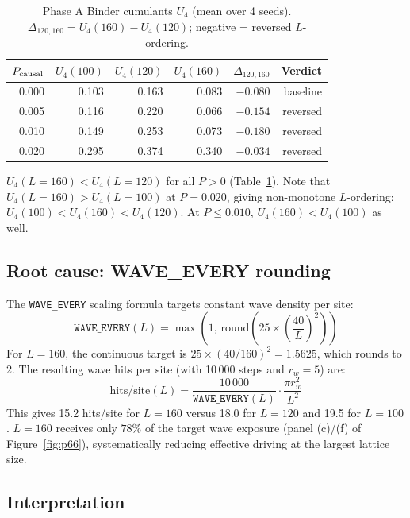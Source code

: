 \documentclass[12pt,a4paper]{article}
\begin{document}
\begin{table}[h]
\centering
\caption{Phase A Binder cumulants $U_4$ (mean over 4 seeds).
$\Delta_{120,160} = U_4(160) - U_4(120)$; negative = reversed $L$-ordering.}
\label{tab:phaseA}
\begin{tabular}{rrrrrr}
\toprule
$P_{\rm causal}$ & $U_4(100)$ & $U_4(120)$ & $U_4(160)$ & $\Delta_{120,160}$ & Verdict \\
\midrule
0.000 & 0.103 & 0.163 & 0.083 & $-0.080$ & baseline \\
0.005 & 0.116 & 0.220 & 0.066 & $-0.154$ & reversed \\
0.010 & 0.149 & 0.253 & 0.073 & $-0.180$ & reversed \\
0.020 & 0.295 & 0.374 & 0.340 & $-0.034$ & reversed \\
\bottomrule
\end{tabular}
\end{table}

$U_4(L=160) < U_4(L=120)$ for all $P > 0$ (Table~\ref{tab:phaseA}).
Note that $U_4(L=160) > U_4(L=100)$ at $P=0.020$,
giving non-monotone $L$-ordering: $U_4(100) < U_4(160) < U_4(120)$.
At $P \le 0.010$, $U_4(160) < U_4(100)$ as well.

\subsection{Root cause: WAVE\_EVERY rounding}

The \texttt{WAVE\_EVERY} scaling formula targets constant wave density per site:
\begin{equation}
  \texttt{WAVE\_EVERY}(L) = \max\!\left(1,\, \text{round}\!\left(25 \times
  \left(\frac{40}{L}\right)^{\!2}\right)\right)
\end{equation}
For $L=160$, the continuous target is $25 \times (40/160)^2 = 1.5625$,
which rounds to 2.  The resulting wave hits per site (with 10\,000 steps and
$r_w = 5$) are:
\begin{equation}
  \text{hits/site}(L) =
  \frac{10\,000}{\texttt{WAVE\_EVERY}(L)} \cdot \frac{\pi r_w^2}{L^2}
\end{equation}
This gives 15.2 hits/site for $L=160$ versus 18.0 for $L=120$ and 19.5 for $L=100$.
$L=160$ receives only $78\%$ of the target wave exposure (panel (c)/(f) of
Figure~\ref{fig:p66}), systematically reducing effective driving at the largest
lattice size.

\subsection{Interpretation}
\end{document}
